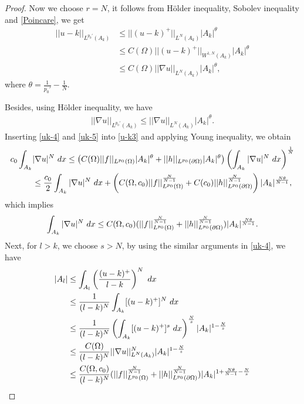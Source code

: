 \documentclass[10pt,a4paper]{amsart}
\numberwithin{equation}{section}
\newcommand{\pa}{\partial}
\newcommand{\dx}{\textup{d}x}
\begin{document}
\begin{proof}
    Now we choose $r = N$, it follows from  H\"{o}lder inequality, Sobolev inequality and \eqref{Poincare}, we get
    \begin{align}\label{uk-4}
        ||u-k||_{L^{p_0'}(A_k)} & \leq ||(u-k)^+||_{L^N(A_k)}|A_k|^{\theta} \nonumber \\
        & \leq C(\Omega)|| (u - k)^+||_{W^{1,N}(A_k)}|A_k|^{\theta} \\
        & \leq C(\Omega) ||\nabla u||_{L^{N}(A_k)}|A_k|^{\theta}, \nonumber
    \end{align}
    where $\theta = \frac{1}{p_0'} - \frac{1}{N} $. 
    
    Besides, using H\"{o}lder inequality, we have
    \begin{align}\label{uk-5}
        ||\nabla u||_{L^{p_0'}(A_k)} \leq ||\nabla u||_{L^{N}(A_k)}|A_k|^{\theta}.
    \end{align}
    Inserting \eqref{uk-4} and \eqref{uk-5} into \eqref{u-k3} and applying Young inequality, we obtain
    \begin{align*}
        c_0 \int_{A_k} & |\nabla u|^N \ \dx  \leq \left( C( \Omega) ||f||_{L^{p_0}(\Omega)} |A_k|^{\theta} + ||h||_{L^{p_0}(\pa \Omega)} |A_k|^{\theta} \right) \left( \int_{A_k} |\nabla u|^N \ \dx \right)^{\frac{1}{N}} \\
        & \leq \frac{c_0}{2}\int_{A_k} |\nabla u|^N \ \dx + \left( C( \Omega, c_0) ||f||_{L^{p_0}(\Omega)}^{\frac{N}{N-1}} + C(c_0)||h||_{L^{p_0}(\pa \Omega)}^{\frac{N}{N-1}} \right)|A_k|^{\frac{N\theta}{N-1}} ,
    \end{align*}
    which implies
    \begin{align}\label{Ln}
        \int_{A_k} |\nabla u|^N \ \dx \leq C(\Omega, c_0) (||f||_{L^{p_0}(\Omega)}^{\frac{N}{N-1}} + ||h||_{L^{p_0}(\pa \Omega)}^{\frac{N}{N-1}} ) |A_k|^{\frac{N \theta}{N-1}}.
    \end{align}
    Next, for $l > k$, we  choose $s > N$, by using the similar arguments in \eqref{uk-4}, we have
    \begin{align*}
        |A_l| & \leq \int_{A_l} \left( \frac{(u-k)^+}{l-k} \right)^N \ \dx\\
        & \leq \frac{1}{(l-k)^N} \int_{A_k} [(u-k)^+]^N \ \dx \\
        & \leq \frac{1}{(l-k)^N} \left(\int_{A_k} [(u-k)^+]^s \ \dx \right)^{\frac{N}{s}} |A_k|^{1-\frac{N}{s}} \\
        & \leq \frac{C(\Omega)}{(l-k)^N} ||\nabla u||_{L^N({A_k})}^N |A_k|^{1 - \frac{N}{s}}\\
        & \leq \frac{C(\Omega, c_0)}{(l-k)^N} (||f||_{L^{p_0}(\Omega)}^{\frac{N}{N-1}} + ||h||_{L^{p_0}(\pa \Omega)}^{\frac{N}{N-1}} )|A_k|^{1 + \frac{N \theta}{N-1} - \frac{N}{s}} \\

\end{align*}
\end{proof}
\end{document}
